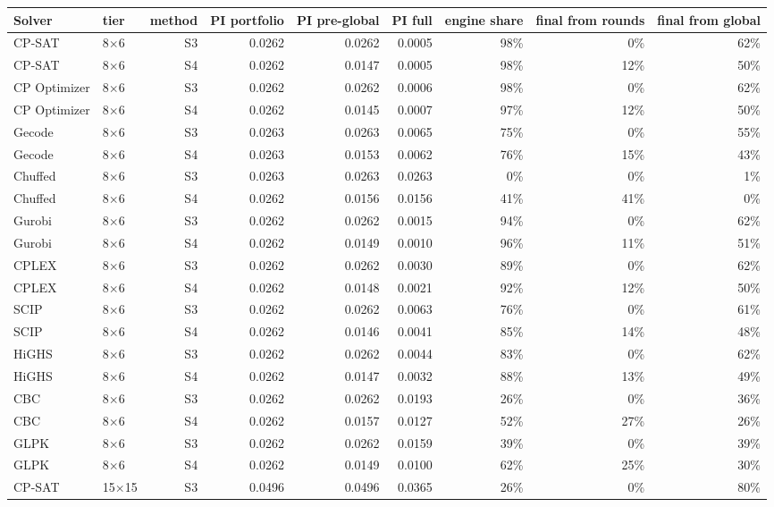 \begin{tabular}{llrrrrrrr}
\toprule
Solver & tier & method & PI portfolio & PI pre-global & PI full & engine share & final from rounds & final from global \\
\midrule
CP-SAT & 8$\times$6 & S3 & 0.0262 & 0.0262 & 0.0005 & 98\% & 0\% & 62\% \\
CP-SAT & 8$\times$6 & S4 & 0.0262 & 0.0147 & 0.0005 & 98\% & 12\% & 50\% \\
CP Optimizer & 8$\times$6 & S3 & 0.0262 & 0.0262 & 0.0006 & 98\% & 0\% & 62\% \\
CP Optimizer & 8$\times$6 & S4 & 0.0262 & 0.0145 & 0.0007 & 97\% & 12\% & 50\% \\
Gecode & 8$\times$6 & S3 & 0.0263 & 0.0263 & 0.0065 & 75\% & 0\% & 55\% \\
Gecode & 8$\times$6 & S4 & 0.0263 & 0.0153 & 0.0062 & 76\% & 15\% & 43\% \\
Chuffed & 8$\times$6 & S3 & 0.0263 & 0.0263 & 0.0263 & 0\% & 0\% & 1\% \\
Chuffed & 8$\times$6 & S4 & 0.0262 & 0.0156 & 0.0156 & 41\% & 41\% & 0\% \\
Gurobi & 8$\times$6 & S3 & 0.0262 & 0.0262 & 0.0015 & 94\% & 0\% & 62\% \\
Gurobi & 8$\times$6 & S4 & 0.0262 & 0.0149 & 0.0010 & 96\% & 11\% & 51\% \\
CPLEX & 8$\times$6 & S3 & 0.0262 & 0.0262 & 0.0030 & 89\% & 0\% & 62\% \\
CPLEX & 8$\times$6 & S4 & 0.0262 & 0.0148 & 0.0021 & 92\% & 12\% & 50\% \\
SCIP & 8$\times$6 & S3 & 0.0262 & 0.0262 & 0.0063 & 76\% & 0\% & 61\% \\
SCIP & 8$\times$6 & S4 & 0.0262 & 0.0146 & 0.0041 & 85\% & 14\% & 48\% \\
HiGHS & 8$\times$6 & S3 & 0.0262 & 0.0262 & 0.0044 & 83\% & 0\% & 62\% \\
HiGHS & 8$\times$6 & S4 & 0.0262 & 0.0147 & 0.0032 & 88\% & 13\% & 49\% \\
CBC & 8$\times$6 & S3 & 0.0262 & 0.0262 & 0.0193 & 26\% & 0\% & 36\% \\
CBC & 8$\times$6 & S4 & 0.0262 & 0.0157 & 0.0127 & 52\% & 27\% & 26\% \\
GLPK & 8$\times$6 & S3 & 0.0262 & 0.0262 & 0.0159 & 39\% & 0\% & 39\% \\
GLPK & 8$\times$6 & S4 & 0.0262 & 0.0149 & 0.0100 & 62\% & 25\% & 30\% \\
\midrule
CP-SAT & 15$\times$15 & S3 & 0.0496 & 0.0496 & 0.0365 & 26\% & 0\% & 80\% \\

\end{tabular}
